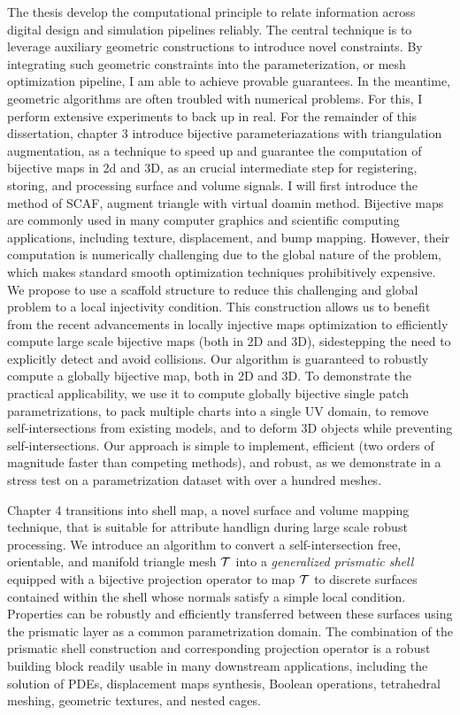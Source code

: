 The thesis develop the computational principle to relate information across digital design and simulation pipelines reliably. 
The central technique is to leverage auxiliary geometric constructions to introduce novel constraints. 
By integrating such geometric constraints into the parameterization, or mesh optimization pipeline,  I am able to achieve provable guarantees. 
In the meantime, geometric algorithms are often troubled with numerical problems. For this, I perform extensive experiments to back up in real.
For the remainder of this dissertation,
chapter 3 introduce bijective parameteriazations with triangulation augmentation, as a technique to speed up and guarantee the computation of bijective maps in 2d and 3D, as an crucial intermediate step for registering, storing, and processing surface and volume signals.
I will first introduce the method of SCAF, 
augment triangle with virtual doamin method.
Bijective maps are commonly used in many computer graphics and scientific computing applications, including texture, displacement, and bump mapping. However, their computation is numerically challenging due to the global nature of the problem, which makes standard smooth optimization techniques prohibitively expensive.
We propose to use a scaffold structure to reduce this challenging and global problem to a local injectivity condition. This construction allows us to benefit from the recent advancements in locally injective maps optimization to efficiently compute large scale bijective maps (both in 2D and 3D), sidestepping the need to explicitly detect and avoid collisions.
Our algorithm is guaranteed to robustly compute a globally bijective map, both in 2D and 3D. To demonstrate the practical applicability, we use it to compute globally bijective single patch parametrizations, to pack multiple charts into a single UV domain, to remove self-intersections from existing models, and to deform 3D objects while preventing self-intersections.
Our approach is simple to implement, efficient (two orders of magnitude faster than competing methods), and robust, as we demonstrate in a stress test on a parametrization dataset with over a hundred meshes.

Chapter 4 transitions into shell map, a novel surface and volume mapping technique, that is suitable for attribute handlign during large scale robust processing. 
We introduce an algorithm to convert a self-intersection free, orientable, and manifold triangle mesh $\mathcal{T}$ into a \emph{generalized prismatic shell} equipped with a bijective projection operator to map $\mathcal{T}$ to  discrete surfaces contained within the shell whose normals satisfy a simple local condition. Properties can be robustly and efficiently transferred between these surfaces using the prismatic layer as a common parametrization domain. 
The combination of the prismatic shell construction and corresponding projection operator is a robust building block readily usable in many downstream applications, including the solution of PDEs, displacement maps synthesis, Boolean operations, tetrahedral meshing, geometric textures, and nested cages.

